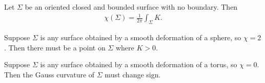 \documentclass{article}
\begin{document}
\begin{theorem}
    Let $\Sigma$ be an oriented closed and bounded surface with no boundary. Then
    \begin{align*}
        \chi(\Sigma) = \frac{1}{2\pi}\int_\Sigma K.
    \end{align*}
\end{theorem}

\begin{corollary}[Notes 15.15]
    Suppose $\Sigma$ is any surface obtained by a smooth deformation of a sphere,
    so $\chi=2$. Then there must be a point on $\Sigma$ where $K>0$.
\end{corollary}

\begin{corollary}[Notes 15.16]
    Suppose $\Sigma$ is any surface obtained by a smooth deformation of a torus,
    so $\chi=0$. Then the Gauss curvature of $\Sigma$ must change sign.
\end{corollary}
\end{document}
